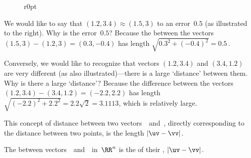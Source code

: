 \begin{wrapfigure}r{0pt}\end{wrapfigure}
\begin{example} 
We would like to say that \((1.2,3.4)\approx(1.5,3)\) to an error~\(0.5\) (as illustrated to the right).
Why is the error~\(0.5\)?  
Because the  between the vectors \((1.5,3)-(1.2,3)=(0.3,-0.4)\) has length \(\sqrt{0.3^2+(-0.4)^2}=0.5\)\,.

Conversely, we would like to recognize that vectors \((1.2,3.4)\) and \((3.4,1.2)\) are very different (as also illustrated)---there is a large `distance' between them.
Why is there a large `distance'?  Because the difference between the vectors \((1.2,3.4)-(3.4,1.2)=(-2.2,2.2)\) has length \(\sqrt{(-2.2)^2+2.2^2}=2.2\sqrt2=3.1113\), which is relatively large.
\end{example}

This concept of distance between two vectors~\uv\ and~\vv, directly corresponding to the distance between two points, is the length \(|\uv-\vv|\).

\begin{definition} \label{def:vecdist}
The  between vectors~\uv\ and~\vv\ in~\(\RR^n\) is the  of their , \(|\uv-\vv|\).
\end{definition}

